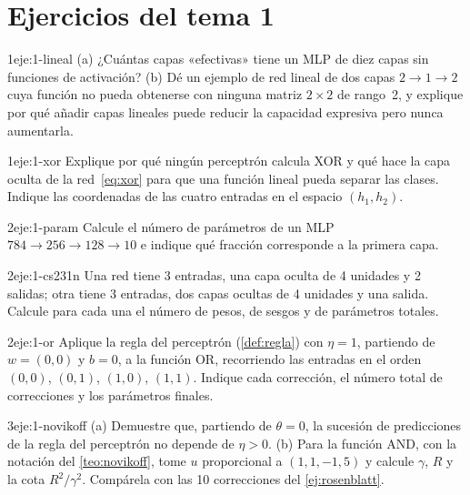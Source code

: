 \section*{Ejercicios del tema 1}

\begin{ejercicio}{1}{eje:1-lineal}
(a) ¿Cuántas capas «efectivas» tiene un MLP de diez capas sin funciones de activación? (b) Dé un ejemplo de red lineal de dos capas $2\to 1\to 2$ cuya función no pueda obtenerse con ninguna matriz $2\times 2$ de rango~2, y explique por qué añadir capas lineales puede reducir la capacidad expresiva pero nunca aumentarla.
\end{ejercicio}

\begin{ejercicio}{1}{eje:1-xor}
Explique por qué ningún perceptrón calcula XOR y qué hace la capa oculta de la red~\eqref{eq:xor} para que una función lineal pueda separar las clases. Indique las coordenadas de las cuatro entradas en el espacio $(h_1,h_2)$.
\end{ejercicio}

\begin{ejercicio}{2}{eje:1-param}
Calcule el número de parámetros de un MLP $784\to 256\to 128\to 10$ e indique qué fracción corresponde a la primera capa.
\end{ejercicio}

\begin{ejercicio}{2}{eje:1-cs231n}
Una red tiene 3 entradas, una capa oculta de 4 unidades y 2 salidas; otra tiene 3 entradas, dos capas ocultas de 4 unidades y una salida. Calcule para cada una el número de pesos, de sesgos y de parámetros totales.
\end{ejercicio}

\begin{ejercicio}{2}{eje:1-or}
Aplique la regla del perceptrón (\cref{def:regla}) con $\eta=1$, partiendo de $w=(0,0)$ y $b=0$, a la función OR, recorriendo las entradas en el orden $(0,0)$, $(0,1)$, $(1,0)$, $(1,1)$. Indique cada corrección, el número total de correcciones y los parámetros finales.
\end{ejercicio}

\begin{ejercicio}{3}{eje:1-novikoff}
(a) Demuestre que, partiendo de $\theta=0$, la sucesión de predicciones de la regla del perceptrón no depende de $\eta>0$. (b) Para la función AND, con la notación del \cref{teo:novikoff}, tome $u$ proporcional a $(1,1,-1{,}5)$ y calcule $\gamma$, $R$ y la cota $R^{2}/\gamma^{2}$. Compárela con las 10 correcciones del \cref{ej:rosenblatt}.
\end{ejercicio}
